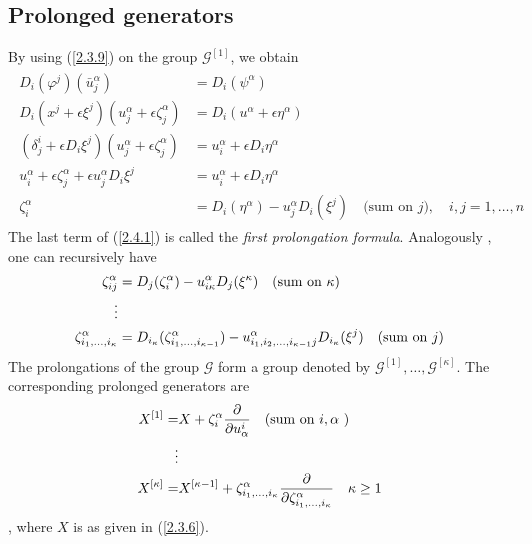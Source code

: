 \subsection{Prolonged generators}
By using (\ref{2.3.9}) on the  group $ \mathcal{G}^{[1]}$, we obtain 
\begin{align}
\begin{aligned}
D_i( \varphi^j)( \bar{u}^{\alpha}_j )& =   D_i( \psi^{\alpha})\\
D_i( x^j + \epsilon \xi^j )( u_j^{\alpha} + \epsilon \zeta_j^{\alpha} )& =   D_i( u^{\alpha } + \epsilon  \eta^{\alpha} ) \\
(\delta^i_j + \epsilon D_i\xi^j )( u_j^{\alpha} + \epsilon \zeta_j^{\alpha} ) &=  u^{\alpha }_i + \epsilon D_i \eta^{\alpha} \\
u^{\alpha}_i +\epsilon \zeta_j^{\alpha} + \epsilon u_j^{\alpha}  D_i \xi^j  &=  u^{\alpha }_i + \epsilon D_i \eta^{\alpha} \\
\zeta_i^{\alpha}&= D_i(\eta^{\alpha}  )- u_j^{\alpha}  D_i (\xi^j) \quad \text{(sum on $j$)},\quad i,j =1,\ldots,n
\end{aligned} \label{2.4.1}
\end{align}
The last term of (\ref{2.4.1}) is called the \textit{first prolongation formula}. Analogously \citep{ibragimov1999elementary}, one can recursively have 
\begin{align}
\begin{aligned}
\zeta_{ij}^{\alpha} &= D_j(\zeta_i^{\alpha}  )- u_{i\kappa}^{\alpha}  D_j (\xi^{\kappa}) \quad   (\text{sum on $ \kappa$})\\
\vdots  \\
\zeta_{i_1,\ldots,i_\kappa}^{\alpha} & = D_{i_\kappa}( \zeta_{i_1,\ldots,i_{\kappa-1}}^{\alpha} )- u_{i_1,i_2,\ldots, i_{\kappa-1}j}^{\alpha}  D_{i_\kappa} (\xi^{j}) \quad   (\text{sum on  $j$})
\end{aligned} \label{2.4.2}
\end{align}
The prolongations of the group $\mathcal{G}$ form a group denoted by $ \mathcal{G}^{[1]},\ldots,  \mathcal{G}^{[\kappa]}$. 
The corresponding prolonged generators are 
\begin{align} \begin{aligned}
X^{[1]} =& X + \zeta_i^{\alpha} \frac{ \partial }{ \partial u^i_{\alpha}} \quad (\text{sum on $ i, \alpha $ } ) \\
\vdots \\
X^{[\kappa]} = &X^{[\kappa-1]} + \zeta_{i_1,\ldots,i_\kappa}^{\alpha} \frac{ \partial }{ \partial \zeta_{i_1,\ldots,i_\kappa}^{\alpha}} \quad \kappa \geq 1
\end{aligned} \label{2.4.3}
\end{align}, where $X$ is as given in (\ref{2.3.6}).


